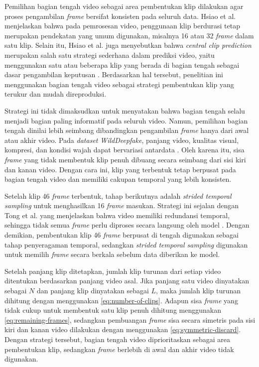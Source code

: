 Pemilihan bagian tengah video sebagai area pembentukan klip dilakukan agar proses pengambilan \textit{frame} bersifat konsisten pada seluruh data. Hsiao et al. menjelaskan bahwa pada pemrosesan video, penggunaan klip berdurasi tetap merupakan pendekatan yang umum digunakan, misalnya 16 atau 32 \textit{frame} dalam satu klip. Selain itu, Hsiao et al. juga menyebutkan bahwa \textit{central clip prediction} merupakan salah satu strategi sederhana dalam prediksi video, yaitu menggunakan satu atau beberapa klip yang berada di bagian tengah sebagai dasar pengambilan keputusan \cite{hsiao2021gcfnetgatedclipfusion}. Berdasarkan hal tersebut, penelitian ini menggunakan bagian tengah video sebagai strategi pembentukan klip yang terukur dan mudah direproduksi. \par

Strategi ini tidak dimaksudkan untuk menyatakan bahwa bagian tengah selalu menjadi bagian paling informatif pada seluruh video. Namun, pemilihan bagian tengah dinilai lebih seimbang dibandingkan pengambilan \textit{frame} hanya dari awal atau akhir video. Pada \textit{dataset} \textit{WildDeepfake}, panjang video, kualitas visual, kompresi, dan kondisi wajah dapat bervariasi antardata \cite{Zi2024}. Oleh karena itu, sisa \textit{frame} yang tidak membentuk klip penuh dibuang secara seimbang dari sisi kiri dan kanan video. Dengan cara ini, klip yang terbentuk tetap berpusat pada bagian tengah video dan memiliki cakupan temporal yang lebih konsisten. \par

Setelah klip 46 \textit{frame} terbentuk, tahap berikutnya adalah \textit{strided temporal sampling} untuk menghasilkan 16 \textit{frame} masukan. Strategi ini sejalan dengan Tong et al. yang menjelaskan bahwa video memiliki redundansi temporal, sehingga tidak semua \textit{frame} perlu diproses secara langsung oleh model \cite{tong2022videomaemaskedautoencodersdataefficient}. Dengan demikian, pembentukan klip 46 \textit{frame} berpusat di tengah digunakan sebagai tahap penyeragaman temporal, sedangkan \textit{strided temporal sampling} digunakan untuk memilih \textit{frame} secara berkala sebelum data diberikan ke model. \par

Setelah panjang klip ditetapkan, jumlah klip turunan dari setiap video ditentukan berdasarkan panjang video asal. Jika panjang satu video dinyatakan sebagai $N$ dan panjang klip dinyatakan sebagai $L$, maka jumlah klip turunan dihitung dengan menggunakan \ref{eq:number-of-clips}. Adapun sisa \textit{frame} yang tidak cukup untuk membentuk satu klip penuh dihitung menggunakan \ref{eq:remaining-frames}, sedangkan pembuangan \textit{frame} sisa secara simetris pada sisi kiri dan kanan video dilakukan dengan menggunakan \ref{eq:symmetric-discard}. Dengan strategi tersebut, bagian tengah video diprioritaskan sebagai area pembentukan klip, sedangkan \textit{frame} berlebih di awal dan akhir video tidak digunakan. \par


